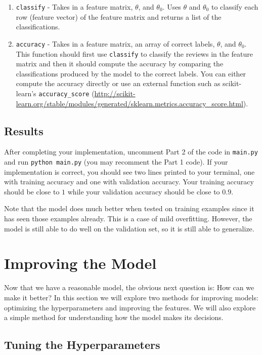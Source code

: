 \documentclass{article}
\begin{document}
\begin{enumerate}
    \item \texttt{classify} - Takes in a feature matrix, $\theta$, and $\theta_0$. Uses $\theta$ and $\theta_0$ to classify each row (feature vector) of the feature matrix and returns a list of the classifications.
    \item \texttt{accuracy} - Takes in a feature matrix, an array of correct labels, $\theta$, and $\theta_0$. This function should first use \texttt{classify} to classify the reviews in the feature matrix and then it should compute the accuracy by comparing the classifications produced by the model to the correct labels. You can either compute the accuracy directly or use an external function such as scikit-learn's \texttt{accuracy\_score} (\url{http://scikit-learn.org/stable/modules/generated/sklearn.metrics.accuracy_score.html}).
\end{enumerate}

\subsection{Results}

After completing your implementation, uncomment Part 2 of the code in \texttt{main.py} and run \texttt{python main.py} (you may recomment the Part 1 code). If your implementation is correct, you should see two lines printed to your terminal, one with training accuracy and one with validation accuracy. Your training accuracy should be close to $1$ while your validation accuracy should be close to $0.9$.

Note that the model does much better when tested on training examples since it has seen those examples already. This is a case of mild overfitting. However, the model is still able to do well on the validation set, so it is still able to generalize.

\section{Improving the Model}

Now that we have a reasonable model, the obvious next question is: How can we make it better? In this section we will explore two methods for improving models: optimizing the hyperparameters and improving the features. We will also explore a simple method for understanding how the model makes its decisions.

\subsection{Tuning the Hyperparameters}
\end{document}
